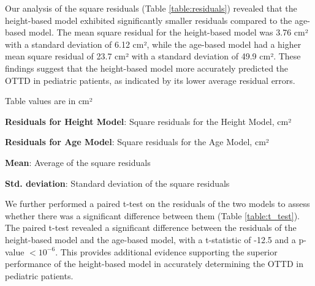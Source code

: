\documentclass[11pt]{article}
\begin{document}
Our analysis of the square residuals (Table \ref{table:residuals}) revealed that the height-based model exhibited significantly smaller residuals compared to the age-based model. The mean square residual for the height-based model was 3.76 cm² with a standard deviation of 6.12 cm², while the age-based model had a higher mean square residual of 23.7 cm² with a standard deviation of 49.9 cm². These findings suggest that the height-based model more accurately predicted the OTTD in pediatric patients, as indicated by its lower average residual errors.

\begin{table}[h]
\caption{Square residuals for the Height Model and the Age Model}
\label{table:residuals}
\begin{threeparttable}
\renewcommand{\TPTminimum}{\linewidth}
\begin{tablenotes}
\footnotesize
\item Table values are in cm²
\item \textbf{Residuals for Height Model}: Square residuals for the Height Model, cm²
\item \textbf{Residuals for Age Model}: Square residuals for the Age Model, cm²
\item \textbf{Mean}: Average of the square residuals
\item \textbf{Std. deviation}: Standard deviation of the square residuals
\end{tablenotes}
\end{threeparttable}
\end{table}


We further performed a paired t-test on the residuals of the two models to assess whether there was a significant difference between them (Table {}\ref{table:t_test}). The paired t-test revealed a significant difference between the residuals of the height-based model and the age-based model, with a t-statistic of -12.5 and a p-value $<$$10^{-6}$. This provides additional evidence supporting the superior performance of the height-based model in accurately determining the OTTD in pediatric patients.
\end{document}
